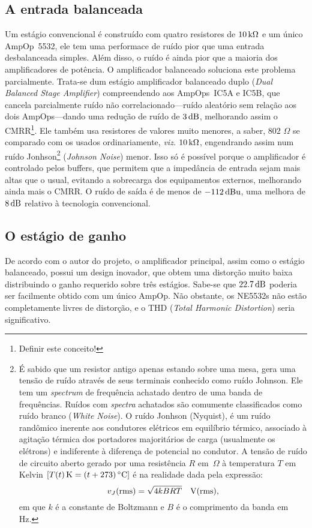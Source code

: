 \documentclass[12pt, a4paper, leqno, twoside]{book}
\def\ohm{\,\Omega}
\def\ampop{AmpOp}
\def\db{{\rm dB}}
\begin{document}
  \subsection{A entrada balanceada}
  Um est\'agio convencional \'e constru\'ido com quatro resistores de $10\,{\rm k}\Omega$ e um \'unico \ampop\ 5532, ele tem uma performace de ru\'ido pior que uma entrada desbalanceada simples. Al\'em disso, o ru\'ido \'e ainda pior que a maioria dos amplificadores de pot\^encia. O amplificador balanceado soluciona este problema parcialmente. Trata-se dum est\'agio amplificador balanceado duplo ({\it Dual Balanced Stage Amplifier}) compreendendo aos \ampop{s}\ IC5A e IC5B, que cancela parcialmente ru\'ido n\~ao correlacionado---ru\'ido aleat\'orio sem rela\c c\~ao aos dois \ampop{s}---dando uma redu\c c\~ao de ru\'ido de $3\,\db$, melhorando assim o CMRR\footnote{Definir este conceito!}. Ele tamb\'em usa resistores de valores muito menores, a saber, $802\,\ohm$ se comparado com os usados ordinariamente, {\it viz.} $10\,{\rm k}\Omega$, engendrando assim num ru\'ido Jonhson\footnote{\'E sabido que um resistor antigo apenas estando sobre uma mesa, gera uma tens\~ao de ru\'ido atrav\'es de seus terminais conhecido como ru\'ido Johnson. Ele tem um {\it spectrum} de frequ\^encia achatado dentro de uma banda de frequ\^encias. Ru\'idos com {\it spectra} achatados s\~ao comumente classificados como ru\'ido branco ({\it White Noise}\/). O ru\'ido Jonhson (Nyquist), \'e um ru\'ido rand\^omico inerente aos condutores el\'etricos em equil\'ibrio t\'ermico, associado \`a agita\c c\~ao t\'ermica dos portadores majorit\'arios de carga (usualmente os el\'etrons) e indiferente \`a diferen\c ca de potencial no condutor. A tens\~ao de ru\'ido de circuito aberto gerado por uma resist\^encia $R$ em $\ohm$ \`a temperatura $T$ em Kelvin $[T(t)\,{\rm K}=(t+273)\,^\circ{\rm C}]$ \'e na realidade dada pela express\~ao:
    $$
      v_{J}({\rm rms})=\sqrt{4kBRT}\quad{\rm V(rms)},
    $$
    em que $k$ \'e a constante de Boltzmann e $B$ \'e o comprimento da banda em Hz.
  } ({\it Johnson Noise}) menor. Isso s\'o \'e poss\'ivel porque o amplificador \'e controlado pelos buffers, que permitem que a imped\^ancia de entrada sejam mais altas que o usual, evitando a sobrecarga dos equipamentos externos, melhorando ainda mais o CMRR. O ru\'ido de sa\'ida \'e de menos de $-112\,\db{\rm u}$, uma melhora de $8\,\db$ relativo \`a tecnologia convencional.
  \subsection{O est\'agio de ganho}
  De acordo com o autor do projeto, o amplificador principal, assim como o est\'agio balanceado, possui um design inovador, que obtem uma distor\c c\~ao muito baixa distribuindo o ganho requerido sobre tr\^es est\'agios. Sabe-se que $22.7\,\db$ poderia ser facilmente obtido com um \'unico \ampop. N\~ao obstante, os NE5532s n\~ao est\~ao completamente livres de distor\c c\~ao, e o THD ({\it Total Harmonic Distortion}\/) seria significativo.
\end{document}
